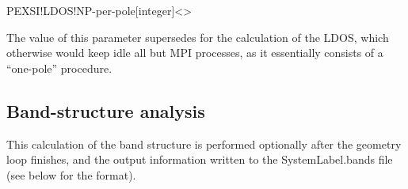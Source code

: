 \begin{fdfentry}{PEXSI!LDOS!NP-per-pole}[integer]<>

  The value of this parameter supersedes  for
  the calculation of the LDOS, which otherwise would keep idle all but
   MPI processes, as it essentially consists of
  a ``one-pole'' procedure.

\end{fdfentry}

\subsection{Band-structure analysis}
\label{sec:band-structure}

This calculation of the band structure is performed optionally after
the geometry loop finishes, and the output information written
to the SystemLabel.bands file (see below for the format).

